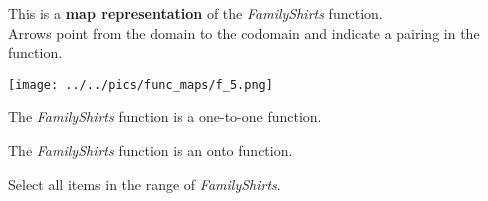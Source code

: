 \documentclass{ximera}
\author{Lee Wayand}
\begin{document}
\begin{exercise}

This is a \textbf{map representation} of the \textit{FamilyShirts} function. \\


Arrows point from the domain to the codomain and indicate a pairing in the function.


\begin{image}
\texttt{[image: ../../pics/func\_maps/f\_5.png]}
\end{image}




\begin{question} 
The \textit{FamilyShirts} function is a one-to-one function.

\begin{multipleChoice}
\end{multipleChoice}
\end{question}







\begin{question} 
The \textit{FamilyShirts} function is an onto function.

\begin{multipleChoice}
\end{multipleChoice}
\end{question}







\begin{question} 

Select all items in the range of \textit{FamilyShirts}.

\begin{selectAll}
\end{selectAll}
\end{question}












\end{exercise}
\end{document}
